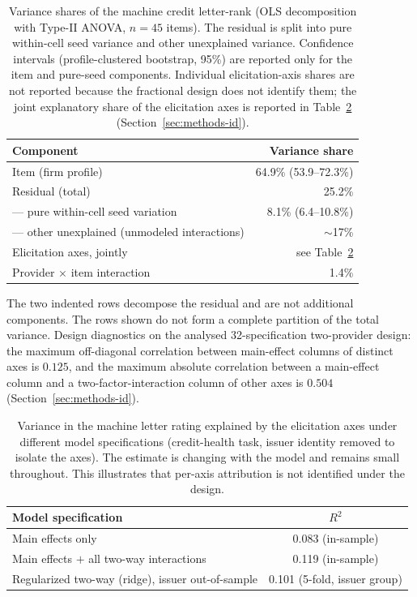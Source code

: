 \documentclass[a4paper,fleqn]{cas-sc}
\begin{document}
\begin{table}[t]\centering
\caption{Variance shares of the machine credit letter-rank (OLS decomposition with Type-II ANOVA,
$n=45$ items). The residual is split into pure within-cell seed variance and other unexplained variance.
Confidence intervals (profile-clustered bootstrap, 95\%) are reported only for the item and pure-seed components. Individual elicitation-axis shares are not reported because the fractional design does not identify them; the joint explanatory share of the elicitation axes is reported in Table~\ref{tab:varrange} (Section~\ref{sec:methods-id}).}\label{tab:var}
\begin{tabular}{lr}\toprule
Component & Variance share \\\midrule
Item (firm profile) & 64.9\% (53.9--72.3\%) \\
Residual (total) & 25.2\% \\
\quad --- pure within-cell seed variation & 8.1\% (6.4--10.8\%) \\
\quad --- other unexplained (unmodeled interactions) & $\sim$17\% \\
Elicitation axes, jointly & see Table~\ref{tab:varrange} \\
Provider $\times$ item interaction & 1.4\% \\\bottomrule
\end{tabular}

\vspace{3pt}
{\footnotesize\raggedright The two indented rows decompose the residual and are not additional
components. The rows shown do not form a complete partition of the total variance. Design diagnostics on the analysed 32-specification two-provider design: the
maximum off-diagonal correlation between main-effect columns of distinct axes is $0.125$, and the
maximum absolute correlation between a main-effect column and a two-factor-interaction column of
other axes is $0.504$ (Section~\ref{sec:methods-id}).}
\end{table}

\begin{table}[t]\centering
\caption{Variance in the machine letter rating explained by the elicitation axes under different model
specifications (credit-health task, issuer identity removed to isolate the axes). The estimate is changing
with the model and remains small throughout. This illustrates that per-axis attribution is not identified under the design.}
\label{tab:varrange}
\begin{tabular}{lc}\toprule
Model specification & $R^2$ \\\midrule
Main effects only & 0.083 (in-sample) \\
Main effects $+$ all two-way interactions & 0.119 (in-sample) \\
Regularized two-way (ridge), issuer out-of-sample & 0.101 (5-fold, issuer group) \\\bottomrule
\end{tabular}\end{table}
\end{document}
